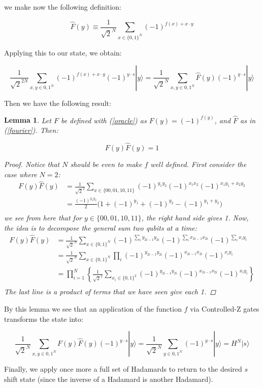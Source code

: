 \documentclass[letterpaper,onecolumn]{quantumarticle}
\newtheorem{lemma}{Lemma}
\newcommand{\be}{\begin{equation}}
\newcommand{\ee}{\end{equation}}
\begin{document}
we make now the following definition:

\be
\label{fourier}
\hat{F}(y) \equiv \frac{1}{\sqrt{2}^N} \sum_{x\in\{0,1\}^N} (-1)^{f(x)+x\cdot y}
\ee

Applying this to our state, we obtain:

$$\frac{1}{\sqrt{2}^{2N}} \sum_{x,y\in {0,1}^N}   (-1)^{f(x )+x\cdot y}(-1)^{y\cdot s}|y \rangle = \frac{1}{\sqrt{2}^{N}} \sum_{x,y\in {0,1}^N}   \hat{F}(y)(-1)^{y\cdot s}|y \rangle$$


Then we have the following result:

\begin{lemma}
\label{fourier_identity}
Let $F$ be defined with (\ref{oracle}) as $F(y) = (-1)^{f(y)}$, and $\hat{F}$ as in (\ref{fourier}). Then:

\be
\label{identity}
F(y)\hat{F}(y)  = 1
\ee

\begin{proof}
Notice that $N$ should be even to make $f$ well defined. First consider the case where $N=2$:
%
\begin{eqnarray*}
F(y)\hat{F}(y)  &= \frac{1}{\sqrt{2}^2} \displaystyle\sum_{x\in \{00,01,10,11 \}} (-1)^{y_1y_2}(-1)^{x_1x_2}(-1)^{x_1y_1+x_2y_2}\\
&=\frac{(-1)^{y_1y_2}}{2} \Big(1+(-1)^{y_1}+(-1)^{y_2} - (-1)^{y_1+y_2} \Big)\\
\end{eqnarray*}
%
we see from here that for $y\in\{00,01,10,11\}$, the right hand side gives 1. Now, the idea is to decompose the general sum two qubits at a time:
%
\begin{eqnarray*}
F(y)\hat{F}(y)  &= \frac{1}{\sqrt{2}^{N}} \displaystyle\sum_{x\in \{0,1 \}^{N}} (-1)^{\sum_i y_{2i-1}y_{2i}}(-1)^{\sum_i x_{2i-1}x_{2i}}(-1)^{\sum_i x_iy_i}\\
&= \frac{1}{\sqrt{2}^{N}} \displaystyle\sum_{x\in \{0,1 \}^{N}} \prod_i (-1)^{ y_{2i-1}y_{2i}}(-1)^{ x_{2i-1}x_{2i}}(-1)^{ x_iy_i}\\
&=  \displaystyle\prod_{i=1}^N  \left\{\frac{1}{\sqrt{2}^{2}}\sum_{x_i\in \{0,1 \}^{2}}  (-1)^{ y_{2i-1}y_{2i}}(-1)^{ x_{2i-1}x_{2i}}(-1)^{ x_iy_i} \right\}\\
\end{eqnarray*}
%
The last line is a product of terms that we have seen give each 1.

\end{proof}
\end{lemma}

By this lemma we see that an application of the function $f$ via \textsf{Controlled-Z} gates transforms the state into:

$$\frac{1}{\sqrt{2}^{N}} \sum_{x,y\in {0,1}^N}   F(y)\hat{F}(y)(-1)^{y\cdot s}|y \rangle = \frac{1}{\sqrt{2}^{N}} \sum_{y\in {0,1}^N} (-1)^{y\cdot s}|y \rangle = H^N |s\rangle$$

Finally, we apply once more a full set of Hadamards to return to the desired $s$ shift state (since the inverse of a Hadamard is another Hadamard).




\end{document}
